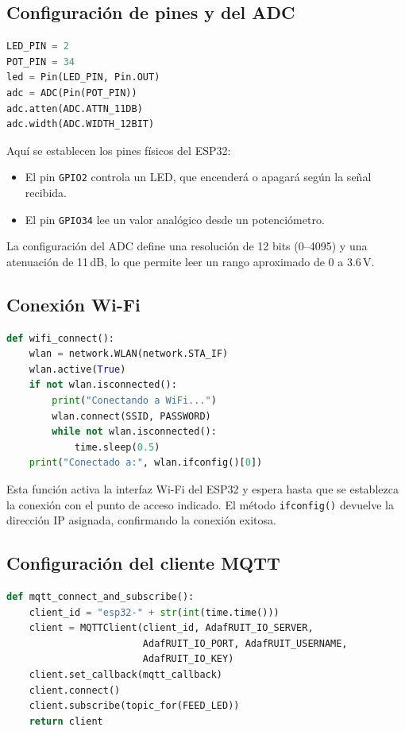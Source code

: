 \documentclass[a4paper,12pt]{article}
\begin{document}
\subsection{Configuración de pines y del ADC}

\begin{lstlisting}[language=Python]
LED_PIN = 2
POT_PIN = 34
led = Pin(LED_PIN, Pin.OUT)
adc = ADC(Pin(POT_PIN))
adc.atten(ADC.ATTN_11DB)
adc.width(ADC.WIDTH_12BIT)
\end{lstlisting}

Aquí se establecen los pines físicos del ESP32:
\begin{itemize}
    \item El pin \texttt{GPIO2} controla un LED, que encenderá o apagará según la señal recibida.
    \item El pin \texttt{GPIO34} lee un valor analógico desde un potenciómetro.  
\end{itemize}
La configuración del ADC define una resolución de 12 bits (0–4095) y una atenuación de 11\,dB, lo que permite leer un rango aproximado de 0 a 3.6\,V.

\subsection{Conexión Wi-Fi}

\begin{lstlisting}[language=Python]
def wifi_connect():
    wlan = network.WLAN(network.STA_IF)
    wlan.active(True)
    if not wlan.isconnected():
        print("Conectando a WiFi...")
        wlan.connect(SSID, PASSWORD)
        while not wlan.isconnected():
            time.sleep(0.5)
    print("Conectado a:", wlan.ifconfig()[0])
\end{lstlisting}

Esta función activa la interfaz Wi-Fi del ESP32 y espera hasta que se establezca la conexión con el punto de acceso indicado.  
El método \texttt{ifconfig()} devuelve la dirección IP asignada, confirmando la conexión exitosa.

\subsection{Configuración del cliente MQTT}

\begin{lstlisting}[language=Python]
def mqtt_connect_and_subscribe():
    client_id = "esp32-" + str(int(time.time()))
    client = MQTTClient(client_id, AdafRUIT_IO_SERVER,
                        AdafRUIT_IO_PORT, AdafRUIT_USERNAME,
                        AdafRUIT_IO_KEY)
    client.set_callback(mqtt_callback)
    client.connect()
    client.subscribe(topic_for(FEED_LED))
    return client
\end{lstlisting}
\end{document}

